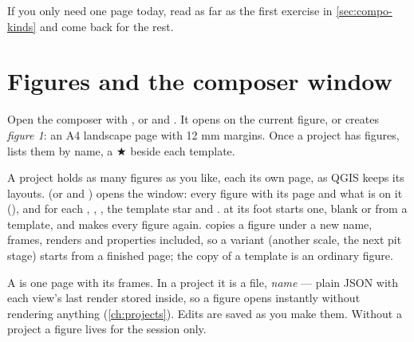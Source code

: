 If you only need one page today, read as far as the first exercise in \cref{sec:compo-kinds} and come back for the rest.

\section{Figures and the composer window}\label{sec:compo-window}

Open the composer with , or  and . It opens on the current figure, or creates \emph{figure 1}: an A4 landscape page with 12 mm margins. Once a project has figures,  lists them by name, a ★ beside each template.

A project holds as many figures as you like, each its own page, as QGIS keeps its layouts.
 (or  and ) opens the  window: every
figure with its page and what is on it (), and for each
, , , the template star and .  at its foot
starts one, blank or from a template, and  makes every figure again.  copies
a figure under a new name, frames, renders and properties included, so a variant (another scale, the
next pit stage) starts from a finished page; the copy of a template is an ordinary figure.


A  is one page with its frames. In a project it is a file, \emph{name} — plain JSON with each view's last render stored inside, so a figure opens instantly without rendering anything (\cref{ch:projects}). Edits are saved as you make them. Without a project a figure lives for the session only.


